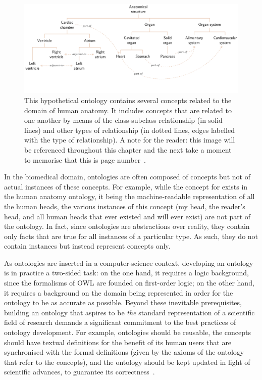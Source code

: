 \begin{figure}
    \centering
    \includegraphics{images/anatomy.pdf}
    \vspace{-\baselineskip}
    \caption[A hypothetical ontology of human anatomical concepts]{This hypothetical ontology contains several concepts related to the domain of human anatomy. It includes concepts that are related to one another by means of the class-subclass relationship (in solid lines) and other types of relationship (in dotted lines, edges labelled with the type of relationship). A note for the reader: this image will be referenced throughout this chapter and the next \mdash take a moment to memorise that this is page number~\pageref{fig:anatomy-ontology}.}
    \label{fig:anatomy-ontology}
\end{figure}

In the biomedical domain, ontologies are often composed of concepts but not of actual instances of these concepts. For example, while the concept for  exists in the human anatomy ontology, it being the machine-readable representation of all the human heads, the various instances of this concept (my head, the reader's head, and all human heads that ever existed and will ever exist) are not part of the ontology. In fact, since ontologies are abstractions over reality, they contain only facts that are true for all instances of a particular type. As such, they do not contain instances but instead represent concepts only.

As ontologies are inserted in a computer-science context, developing an ontology is in practice a two-sided task: on the one hand, it requires a logic background, since the formalisms of OWL are founded on first-order logic; on the other hand, it requires a background on the domain being represented in order for the ontology to be as accurate as possible. Beyond these inevitable prerequisites, building an ontology that aspires to be \emph{the} standard representation of a scientific field of research demands a significant commitment to the best practices of ontology development. For example, ontologies should be reusable, the concepts should have textual definitions for the benefit of its human users that are synchronised with the formal definitions (given by the axioms of the ontology that refer to the concepts), and the ontology should be kept updated in light of scientific advances, to guarantee its correctness~\citep{Noy2001}.

